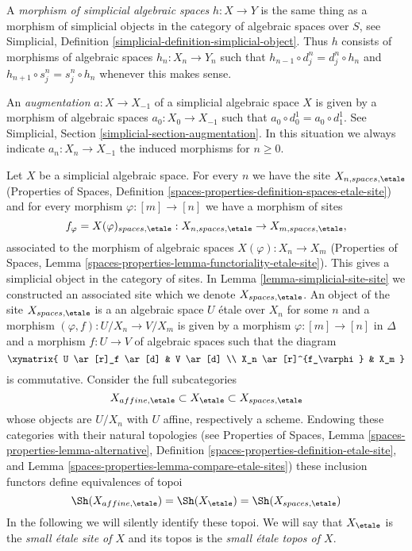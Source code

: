 \medskip\noindent
A {\it morphism of simplicial algebraic spaces} $h : X \to Y$ is the same
thing as a morphism of simplicial objects in
the category of algebraic spaces over $S$,
see Simplicial, Definition \ref{simplicial-definition-simplicial-object}.
Thus $h$ consists of morphisms of algebraic spaces $h_n : X_n \to Y_n$
such that $h_{n - 1} \circ d^n_j = d^n_j \circ h_n$ and
$h_{n + 1} \circ s^n_j = s^n_j \circ h_n$ whenever this makes sense.

\medskip\noindent
An {\it augmentation} $a : X \to X_{-1}$
of a simplicial algebraic space $X$ is given by a morphism
of algebraic spaces $a_0 : X_0 \to X_{-1}$
such that $a_0 \circ d^1_0 = a_0 \circ d^1_1$.
See Simplicial, Section \ref{simplicial-section-augmentation}.
In this situation we always indicate $a_n : X_n \to X_{-1}$ the induced
morphisms for $n \geq 0$.

\medskip\noindent
Let $X$ be a simplicial algebraic space. For every $n$ we have the
site $X_{n, spaces, \etale}$ (Properties of Spaces, Definition
\ref{spaces-properties-definition-spaces-etale-site})
and for every morphism $\varphi : [m] \to [n]$ we have a morphism of sites
$$
f_\varphi = X(\varphi)_{spaces, \etale} :
X_{n, spaces, \etale} \to X_{m, spaces, \etale},
$$
associated to the morphism of algebraic spaces
$X(\varphi) : X_n \to X_m$ (Properties of Spaces, Lemma
\ref{spaces-properties-lemma-functoriality-etale-site}).
This gives a simplicial object in the category of sites.
In Lemma \ref{lemma-simplicial-site-site} we constructed an associated
site which we denote $X_{spaces, \etale}$.
An object of the site $X_{spaces, \etale}$ is a
an algebraic space $U$ \'etale over $X_n$ for some $n$
and a morphism $(\varphi, f) : U/X_n \to V/X_m$ is given
by a morphism $\varphi : [m] \to [n]$ in $\Delta$ and a morphism
$f : U \to V$ of algebraic spaces such that the diagram
$$
\xymatrix{
U \ar[r]_f \ar[d] & V \ar[d] \\
X_n \ar[r]^{f_\varphi} & X_m
}
$$
is commutative. Consider the full subcategories
$$
X_{affine, \etale} \subset X_\etale \subset X_{spaces, \etale}
$$
whose objects are $U/X_n$ with $U$ affine, respectively a scheme.
Endowing these categories with their natural topologies
(see
Properties of Spaces, Lemma \ref{spaces-properties-lemma-alternative},
Definition \ref{spaces-properties-definition-etale-site}, and
Lemma \ref{spaces-properties-lemma-compare-etale-sites})
these inclusion functors define equivalences of topoi
$$
\Sh(X_{affine, \etale}) = \Sh(X_\etale) = \Sh(X_{spaces, \etale})
$$
In the following we will silently identify these topoi.
We will say that $X_\etale$ is the {\it small \'etale site of $X$}
and its topos is the {\it small \'etale topos of $X$}.


